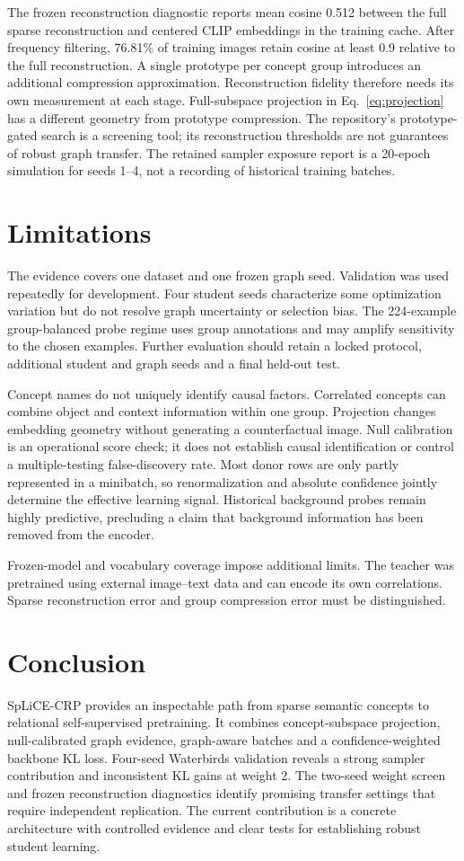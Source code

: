 \documentclass[11pt,a4paper]{article}
\begin{document}
The frozen reconstruction diagnostic reports mean cosine 0.512 between the
full sparse reconstruction and centered CLIP embeddings in the training cache.
After frequency filtering, 76.81\% of training images retain cosine at least
0.9 relative to the full reconstruction. A single prototype per concept group
introduces an additional compression approximation. Reconstruction fidelity
therefore needs its own measurement at each stage. Full-subspace projection
in Eq.~\ref{eq:projection} has a different geometry from prototype compression.
The repository's prototype-gated search is a screening tool; its reconstruction
thresholds are not guarantees of robust graph transfer. The retained sampler
exposure report is a 20-epoch simulation for seeds 1--4, not a recording of
historical training batches.

\section{Limitations}
The evidence covers one dataset and one frozen graph seed. Validation was used
repeatedly for development. Four student seeds characterize some optimization
variation but do not resolve graph uncertainty or selection bias. The 224-example
group-balanced probe regime uses group annotations and may amplify sensitivity
to the chosen examples. Further evaluation should retain a locked protocol,
additional student and graph seeds and a final held-out test.

Concept names do not uniquely identify causal factors. Correlated concepts can
combine object and context information within one group. Projection changes
embedding geometry without generating a counterfactual image. Null calibration
is an operational score check; it does not establish causal identification or
control a multiple-testing false-discovery rate. Most donor rows are only partly
represented in a minibatch, so renormalization and absolute confidence jointly
determine the effective learning signal. Historical background probes remain
highly predictive, precluding a claim that background information has been
removed from the encoder.

Frozen-model and vocabulary coverage impose additional limits. The teacher was
pretrained using external image--text data and can encode its own correlations.
Sparse reconstruction error and group compression error must be distinguished.

\section{Conclusion}
SpLiCE-CRP provides an inspectable path from sparse semantic concepts to
relational self-supervised pretraining. It combines concept-subspace projection,
null-calibrated graph evidence, graph-aware batches and a confidence-weighted
backbone KL loss. Four-seed Waterbirds validation reveals a strong sampler
contribution and inconsistent KL gains at weight 2. The two-seed weight screen
and frozen reconstruction diagnostics identify promising transfer settings
that require independent replication. The current contribution is a concrete
architecture with controlled evidence and clear tests for establishing robust
student learning.
\end{document}
